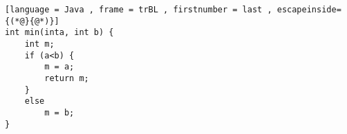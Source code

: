 \begin{lstlisting}[language = Java , frame = trBL , firstnumber = last , escapeinside={(*@}{@*)}]
int min(inta, int b) {
    int m;
    if (a<b) {
        m = a;
        return m;
    }
    else
        m = b;
}
\end{lstlisting}

